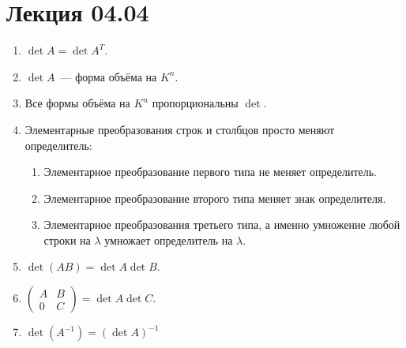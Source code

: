 \section{Лекция 04.04}
\begin{theorem}\leavevmode
    \begin{enumerate}
        \item $\det A = \det A^T$.
        \item $\det A$~--- форма объёма на $K^n$.
        \item Все формы объёма на $K^n$ пропорциональны $\det$.
        \item Элементарные преобразования строк и столбцов просто меняют определитель:
            \begin{enumerate}
                \item Элементарное преобразование первого типа не меняет определитель.
                \item Элементарное преобразование второго типа меняет знак определителя.
                \item Элементарное преобразования третьего типа, а именно умножение любой строки на $\lambda$ умножает
                    определитель на $\lambda$.
            \end{enumerate}
        \item  $\det(AB) = \det A\det B$.
        \item  $\left(\begin{array}{c|c}
                A & B\\
                \hline
                0 & C
        \end{array}\right) = \det A \det C
        .$ 
    \item $\det(A^{-1}) = (\det A)^{-1}$
    \end{enumerate}
\end{theorem}
